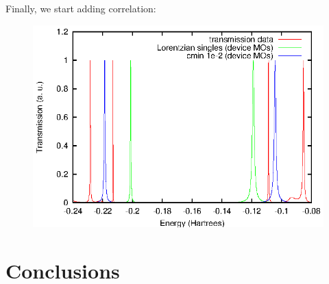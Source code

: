 Finally, we start adding correlation:

\begin{figure}
	\begin{center}
		\includegraphics[width=0.9\linewidth]{figures/cipeaks-device}
	\end{center}
	\caption{}
	\label{fig:cipeaks-device}
\end{figure}

\section{Conclusions}
\label{sec:conclusions}

